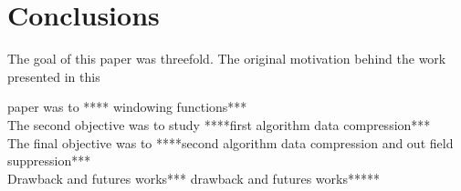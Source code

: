 \documentclass[useAMS,usenatbib]{mn2e}
\begin{document}
\section{Conclusions}
The goal of this paper was threefold. The original motivation behind the work presented in this

paper was to **** windowing functions***\\
The second objective  was to study ****first algorithm data compression***\\
The final objective was to ****second algorithm data compression and out field suppression*** \\
Drawback and futures works*** drawback and futures works*****
\end{document}
